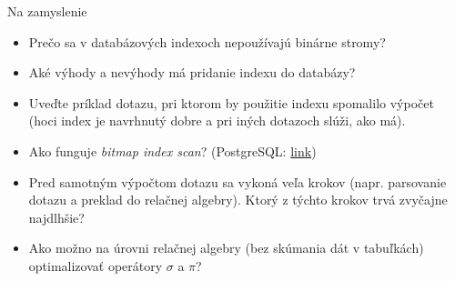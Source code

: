 \documentclass[12pt]{beamer}
\begin{document}
\begin{frame}{Na zamyslenie}
\begin{itemize}
\item Prečo sa v databázových indexoch nepoužívajú binárne stromy?
\item Aké výhody a nevýhody má pridanie indexu do databázy?
\item Uveďte príklad dotazu, pri ktorom by použitie indexu spomalilo výpočet (hoci index je navrhnutý dobre a pri iných dotazoch slúži, ako má).
\item Ako funguje \emph{bitmap index scan}? (PostgreSQL: \href{https://www.postgresql.org/docs/current/indexes-bitmap-scans.html}{link})
\item Pred samotným výpočtom dotazu sa vykoná veľa krokov (napr. parsovanie dotazu a preklad do relačnej algebry).
    Ktorý z týchto krokov trvá zvyčajne najdlhšie?
\item Ako možno na úrovni relačnej algebry (bez skúmania dát v tabuľkách) optimalizovať operátory $\sigma$ a $\pi$?
\end{itemize}
\end{frame}
\end{document}
